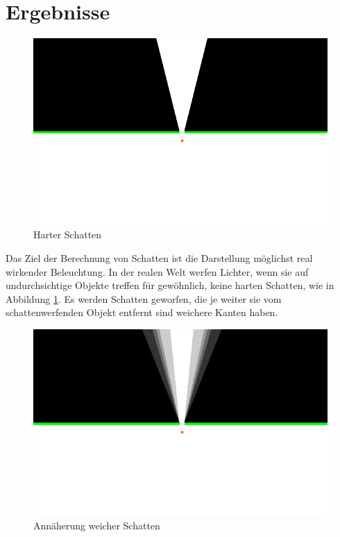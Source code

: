 \section{Ergebnisse}

\begin{figure}[t]
	\centering
	\includegraphics[width=\columnwidth]{images/ergebnis_3.png}
	\caption{Harter Schatten}
	\label{fig:ergeb4}
\end{figure}

Das Ziel der Berechnung von Schatten ist die Darstellung möglichst real wirkender Beleuchtung. In
der realen Welt werfen Lichter, wenn sie auf undurchsichtige Objekte treffen für gewöhnlich, keine
harten Schatten, wie in Abbildung \ref{fig:ergeb4}. Es werden Schatten geworfen, die je weiter sie vom schattenwerfenden Objekt entfernt sind weichere Kanten haben.

\begin{figure}[t]
	\centering
	\includegraphics[width=\columnwidth]{images/ergebnis_2.png}
	\caption{Annäherung weicher Schatten}
	\label{fig:ergeb3}
\end{figure}

